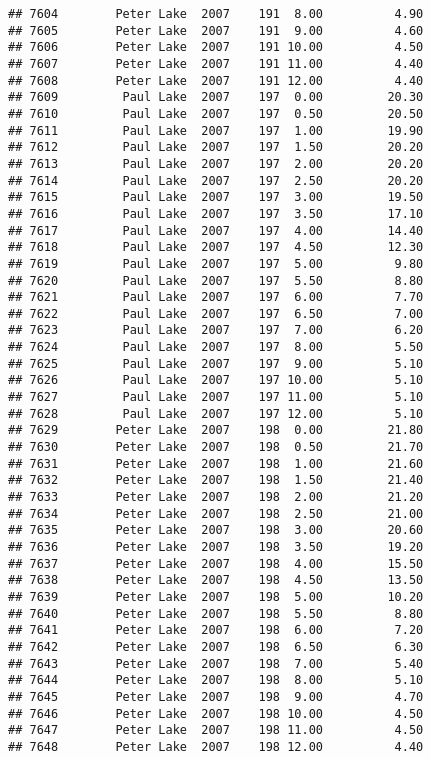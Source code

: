\documentclass[
]{article}
\begin{document}
\begin{verbatim}
## 7604        Peter Lake  2007    191  8.00          4.90
## 7605        Peter Lake  2007    191  9.00          4.60
## 7606        Peter Lake  2007    191 10.00          4.50
## 7607        Peter Lake  2007    191 11.00          4.40
## 7608        Peter Lake  2007    191 12.00          4.40
## 7609         Paul Lake  2007    197  0.00         20.30
## 7610         Paul Lake  2007    197  0.50         20.50
## 7611         Paul Lake  2007    197  1.00         19.90
## 7612         Paul Lake  2007    197  1.50         20.20
## 7613         Paul Lake  2007    197  2.00         20.20
## 7614         Paul Lake  2007    197  2.50         20.20
## 7615         Paul Lake  2007    197  3.00         19.50
## 7616         Paul Lake  2007    197  3.50         17.10
## 7617         Paul Lake  2007    197  4.00         14.40
## 7618         Paul Lake  2007    197  4.50         12.30
## 7619         Paul Lake  2007    197  5.00          9.80
## 7620         Paul Lake  2007    197  5.50          8.80
## 7621         Paul Lake  2007    197  6.00          7.70
## 7622         Paul Lake  2007    197  6.50          7.00
## 7623         Paul Lake  2007    197  7.00          6.20
## 7624         Paul Lake  2007    197  8.00          5.50
## 7625         Paul Lake  2007    197  9.00          5.10
## 7626         Paul Lake  2007    197 10.00          5.10
## 7627         Paul Lake  2007    197 11.00          5.10
## 7628         Paul Lake  2007    197 12.00          5.10
## 7629        Peter Lake  2007    198  0.00         21.80
## 7630        Peter Lake  2007    198  0.50         21.70
## 7631        Peter Lake  2007    198  1.00         21.60
## 7632        Peter Lake  2007    198  1.50         21.40
## 7633        Peter Lake  2007    198  2.00         21.20
## 7634        Peter Lake  2007    198  2.50         21.00
## 7635        Peter Lake  2007    198  3.00         20.60
## 7636        Peter Lake  2007    198  3.50         19.20
## 7637        Peter Lake  2007    198  4.00         15.50
## 7638        Peter Lake  2007    198  4.50         13.50
## 7639        Peter Lake  2007    198  5.00         10.20
## 7640        Peter Lake  2007    198  5.50          8.80
## 7641        Peter Lake  2007    198  6.00          7.20
## 7642        Peter Lake  2007    198  6.50          6.30
## 7643        Peter Lake  2007    198  7.00          5.40
## 7644        Peter Lake  2007    198  8.00          5.10
## 7645        Peter Lake  2007    198  9.00          4.70
## 7646        Peter Lake  2007    198 10.00          4.50
## 7647        Peter Lake  2007    198 11.00          4.50
## 7648        Peter Lake  2007    198 12.00          4.40

\end{verbatim}
\end{document}
